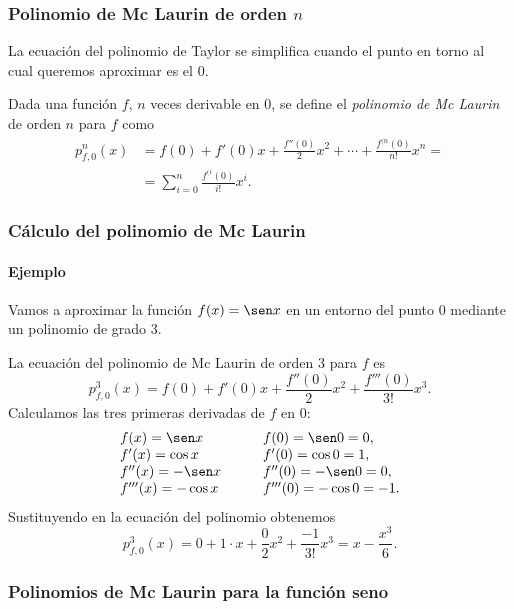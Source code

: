 \begin{frame}
\frametitle{Polinomio de Mc Laurin de orden $n$}
La ecuación del polinomio de Taylor se simplifica cuando el punto en torno al cual queremos aproximar es el $0$.
\begin{definicion}
Dada una función $f$, $n$ veces derivable en $0$, se define el \emph{polinomio de Mc Laurin} de orden $n$ para $f$ como
\begin{align*}
p_{f,0}^n(x)&=f(0)+f'(0)x+\frac{f''(0)}{2}x^2+\cdots +\frac{f^{(n}(0)}{n!}x^n = \\ &=\sum_{i=0}^{n}\frac{f^{(i}(0)}{i!}x^i.
\end{align*}
\end{definicion}
\end{frame}


\begin{frame}
\frametitle{Cálculo del polinomio de Mc Laurin}
\framesubtitle{Ejemplo}
Vamos a aproximar la función $f(x)=\sen x$ en un entorno del punto $0$ mediante un polinomio de grado $3$.

La ecuación del polinomio de Mc Laurin de orden $3$ para $f$ es
\[
p_{f,0}^3(x)=f(0)+f'(0)x+\frac{f''(0)}{2}x^2+\frac{f'''(0)}{3!}x^3.
\]
Calculamos las tres primeras derivadas de $f$ en $0$:
\[
\begin{array}{lll}
f(x)=\sen x & \quad & f(0)=\sen 0 =0,\\
f'(x)=\cos x & & f'(0)=\cos 0=1,\\
f''(x)=-\sen x & & f''(0)=-\sen 0=0,\\
f'''(x)=-\cos x & & f'''(0)=-\cos 0=-1.
\end{array}
\]
Sustituyendo en la ecuación del polinomio obtenemos
\[
p_{f,0}^3(x)=0+1\cdot x+\frac{0}{2}x^2+\frac{-1}{3!}x^3= x-\frac{x^3}{6}.
\]
\end{frame}


\begin{frame}
\frametitle{Polinomios de Mc Laurin para la función seno}
\begin{center}
\scalebox{1}{}
\end{center}
\end{frame}


